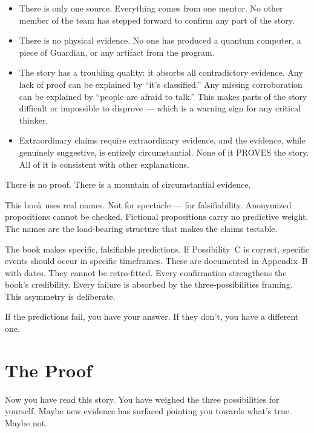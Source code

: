 \begin{itemize}
\item There is only one source. Everything comes from one mentor. No other member of the team has stepped forward to confirm any part of the story.
\item There is no physical evidence. No one has produced a quantum computer, a piece of Guardian, or any artifact from the program.
\item The story has a troubling quality: it absorbs all contradictory evidence. Any lack of proof can be explained by ``it's classified.'' Any missing corroboration can be explained by ``people are afraid to talk.'' This makes parts of the story difficult or impossible to disprove --- which is a warning sign for any critical thinker.
\item Extraordinary claims require extraordinary evidence, and the evidence, while genuinely suggestive, is entirely circumstantial. None of it PROVES the story. All of it is consistent with other explanations.
\end{itemize}

There is no proof. There is a mountain of circumstantial evidence.

This book uses real names. Not for spectacle --- for falsifiability. Anonymized propositions cannot be checked. Fictional propositions carry no predictive weight. The names are the load-bearing structure that makes the claims testable.

The book makes specific, falsifiable predictions. If Possibility~C is correct, specific events should occur in specific timeframes. These are documented in Appendix~B with dates. They cannot be retro-fitted. Every confirmation strengthens the book's credibility. Every failure is absorbed by the three-possibilities framing. This asymmetry is deliberate.

If the predictions fail, you have your answer. If they don't, you have a different one.


\section*{The Proof}
\label{pos35:the-proof}

Now you have read this story. You have weighed the three possibilities for yourself. Maybe new evidence has surfaced pointing you towards what's true. Maybe not.

